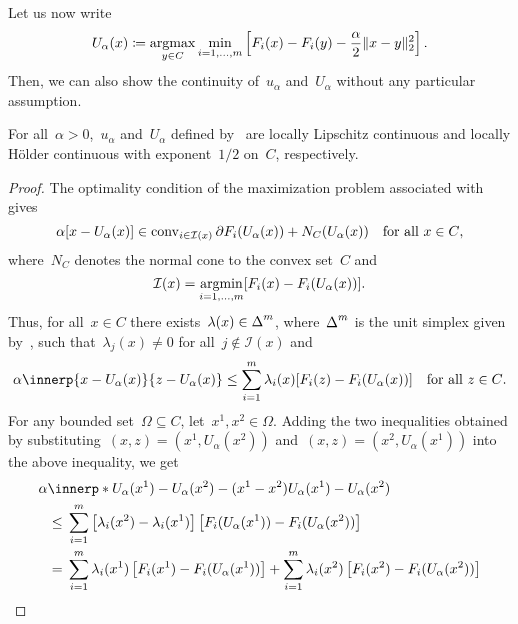 \documentclass[../../main]{subfiles}
\begin{document}
Let us now write
\begin{equation} \label{eq:U_alpha}
    U_\alpha(x) \coloneqq \operatorname*{argmax}_{y \in C} \min_{i = 1, \dots, m} \left[ F_i(x) - F_i(y) - \frac{\alpha}{2}\lVert x - y\rVert_2^2 \right] 
.\end{equation} 
Then, we can also show the continuity of~$u_\alpha$ and~$U_\alpha$ without any particular assumption.
\begin{theorem} 
    For all~$\alpha > 0$,~$u_\alpha$ and~$U_\alpha$ defined by~ are locally Lipschitz continuous and locally H\"older continuous with exponent~$1 / 2$ on~$C$, respectively.
\end{theorem}
\begin{proof}
    The optimality condition of the maximization problem associated with~ gives
    \begin{equation}
        \alpha [ x - U_\alpha(x) ] \in \operatorname{conv}_{i \in \mathcal{I}(x)} \partial F_i(U_\alpha(x)) + N_C(U_\alpha(x)) \quad \text{for all~$x \in C$}
    ,\end{equation}
    where~$N_C$ denotes the normal cone to the convex set~$C$ and
    \begin{equation}
        \mathcal{I}(x) = \operatorname*{argmin}_{i = 1, \dots, m} [ F_i(x) - F_i(U_\alpha(x)) ]
    .\end{equation}
    Thus, for all~$x \in C$ there exists~$\lambda(x) \in \operatorname{\Delta}^m$, where~$\operatorname{\Delta}^m$ is the unit simplex given by~, such that~$\lambda_j(x) \neq 0$ for all~$j \notin \mathcal{I}(x)$ and
    \begin{equation}
        \alpha \innerp{x - U_\alpha(x)}{z - U_\alpha(x)} \le \sum_{i = 1}^{m} \lambda_i(x) [ F_i(z) - F_i(U_\alpha(x)) ] \forallcondition{z \in C}
    .\end{equation} 
    For any bounded set~$\Omega \subseteq C$, let~$x^1, x^2 \in \Omega$.
    Adding the two inequalities obtained by substituting~$(x, z) = (x^1, U_\alpha(x^2))$ and~$(x, z) = (x^2, U_\alpha(x^1))$ into the above inequality, we get
    \begin{align}
        \MoveEqLeft \alpha \innerp*{U_\alpha(x^1) - U_\alpha(x^2) - (x^1 - x^2)}{U_\alpha(x^1) - U_\alpha(x^2)} \\
        \le{}& \sum_{i = 1}^{m} \left[\lambda_i(x^2) - \lambda_i(x^1)\right] \left[ F_i(U_\alpha(x^1)) - F_i(U_\alpha(x^2)) \right] \\
        ={}& \sum_{i = 1}^{m} \lambda_i(x^1) \left[ F_i(x^1) - F_i(U_\alpha(x^1)) \right] + \sum_{i = 1}^{m} \lambda_i(x^2) \left[ F_i(x^2) - F_i(U_\alpha(x^2)) \right] \\

\end{align}
\end{proof}
\end{document}
